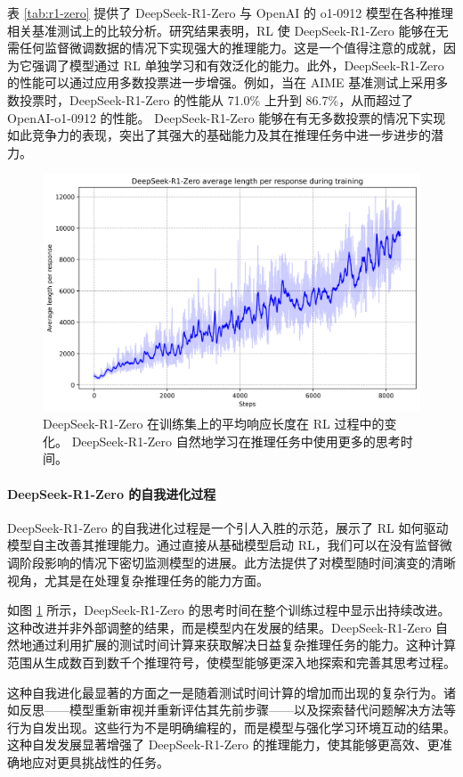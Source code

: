 \documentclass[11pt, a4paper, logo, copyright, nonumbering]{deepseek}
\newcommand{\dsro}{DeepSeek-R1-Zero}
\begin{document}
表 \ref{tab:r1-zero} 提供了 \dsro{} 与 OpenAI 的 o1-0912 模型在各种推理相关基准测试上的比较分析。研究结果表明，RL 使 \dsro{} 能够在无需任何监督微调数据的情况下实现强大的推理能力。这是一个值得注意的成就，因为它强调了模型通过 RL 单独学习和有效泛化的能力。此外，\dsro{} 的性能可以通过应用多数投票进一步增强。例如，当在 AIME 基准测试上采用多数投票时，\dsro{} 的性能从 71.0\% 上升到 86.7\%，从而超过了 OpenAI-o1-0912 的性能。
\dsro{} 能够在有无多数投票的情况下实现如此竞争力的表现，突出了其强大的基础能力及其在推理任务中进一步进步的潜力。

\begin{figure}[t]
    \centering
    \includegraphics[width=0.75\linewidth]{figures/plot_length.png}
    \caption{\dsro{} 在训练集上的平均响应长度在 RL 过程中的变化。 \dsro{} 自然地学习在推理任务中使用更多的思考时间。}
    \label{fig:zero-training-length}
\end{figure}

\paragraph{\dsro{} 的自我进化过程}
\dsro{} 的自我进化过程是一个引人入胜的示范，展示了 RL 如何驱动模型自主改善其推理能力。通过直接从基础模型启动 RL，我们可以在没有监督微调阶段影响的情况下密切监测模型的进展。此方法提供了对模型随时间演变的清晰视角，尤其是在处理复杂推理任务的能力方面。

如图 \ref{fig:zero-training-length} 所示，\dsro{} 的思考时间在整个训练过程中显示出持续改进。这种改进并非外部调整的结果，而是模型内在发展的结果。\dsro{} 自然地通过利用扩展的测试时间计算来获取解决日益复杂推理任务的能力。这种计算范围从生成数百到数千个推理符号，使模型能够更深入地探索和完善其思考过程。

这种自我进化最显著的方面之一是随着测试时间计算的增加而出现的复杂行为。诸如反思——模型重新审视并重新评估其先前步骤——以及探索替代问题解决方法等行为自发出现。这些行为不是明确编程的，而是模型与强化学习环境互动的结果。这种自发发展显著增强了 \dsro{} 的推理能力，使其能够更高效、更准确地应对更具挑战性的任务。
\end{document}
